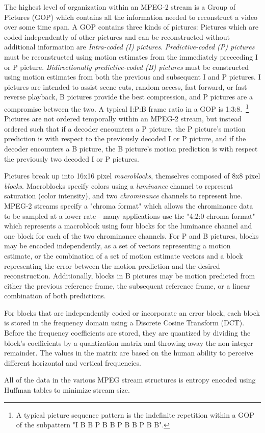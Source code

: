 The highest level of organization within an MPEG-2 stream is a Group
of Pictures (GOP) which contains all the information needed to
reconstruct a video over some time span. A GOP contains three kinds of
pictures: Pictures which are coded independently of other pictures and
can be reconstructed without additional information are
{\it Intra-coded (I) pictures}. {\it Predictive-coded (P) pictures} must
be reconstructed using motion estimates from the immediately
preceeding I or P picture. {\it Bidirectionally predictive-coded (B)
  pictures} must be constructed using motion estimates from both the
previous and subsequent I and P pictures. I pictures are intended to
assist scene cuts, random access, fast forward, or fast reverse
playback\cite{MPEG2, Page 14 6.1.1.7}, B pictures provide the best
compression, and P pictures are a compromise between the two. A
typical I:P:B frame ratio in a GOP is 1:3:8.~\footnote{A typical
  picture sequence pattern is the indefinite repetition within a GOP
  of the subpattern "I B B P B B P B B P B B".} Pictures are not
ordered temporally within an MPEG-2 stream, but instead ordered such
that if a decoder encounters a P picture, the P picture's motion
prediction is with respect to the previously decoded I or P picture,
and if the decoder encounters a B picture, the B picture's motion
prediction is with respect the previously two decoded I or P pictures.

Pictures break up into 16x16 pixel {\it macroblocks}, themselves
composed of 8x8 pixel {\it blocks}. Macroblocks specify colors using a
{\it luminance} channel to represent saturation (color intensity), and
two {\it chrominance} channels to represent hue. MPEG-2 streams specify
a "chroma format" which allows the chrominance data to be sampled at a
lower rate - many applications use the "4:2:0 chroma format" which
represents a macroblock using four blocks for the luminance channel
and one block for each of the two chrominance channels. For P and B
pictures, blocks may be encoded independently, as a set of vectors
representing a motion estimate, or the combination of a set of motion
estimate vectors and a block representing the error between the motion
prediction and the desired reconstruction. Additionally, blocks in B
pictures may be motion predicted from either the previous reference
frame, the subsequent reference frame, or a linear combination of both
predictions.

For blocks that are independently coded or incorporate an error block,
each block is stored in the frequency domain using a Discrete Cosine
Transform (DCT). Before the frequency coefficients are stored, they
are quantized by dividing the block's coefficients by a quantization
matrix and throwing away the non-integer remainder. The values in the
matrix are based on the human ability to perceive different horizontal
and vertical frequencies.

All of the data in the various MPEG stream structures is entropy
encoded using Huffman tables to minimize stream size.

